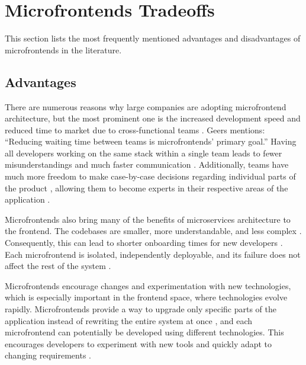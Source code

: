 \section{Microfrontends Tradeoffs}
This section lists the most frequently mentioned advantages and disadvantages of microfrontends in the literature.

\subsection{Advantages}
There are numerous reasons why large companies are adopting microfrontend architecture, but the most prominent one is the increased development speed and reduced time to market due to cross-functional teams \cite{Geers, Montelius, Peltonen}. Geers \cite{Geers} mentions: ``Reducing waiting time between teams is microfrontends' primary goal.'' Having all developers working on the same stack within a single team leads to fewer misunderstandings and much faster communication \cite{Geers, Montelius}. Additionally, teams have much more freedom to make case-by-case decisions regarding individual parts of the product \cite{Jackson, Geers}, allowing them to become experts in their respective areas of the application \cite{Montelius}.

Microfrontends also bring many of the benefits of microservices architecture to the frontend. The codebases are smaller, more understandable, and less complex \cite{Geers, Jackson, Montelius}. Consequently, this can lead to shorter onboarding times for new developers \cite{Peltonen}. Each microfrontend is isolated, independently deployable, and its failure does not affect the rest of the system \cite{Peltonen, Montelius, Jackson, Geers}.

Microfrontends encourage changes and experimentation with new technologies, which is especially important in the frontend space, where technologies evolve rapidly. Microfrontends provide a way to upgrade only specific parts of the application instead of rewriting the entire system at once \cite{Jackson, Montelius}, and each microfrontend can potentially be developed using different technologies. This encourages developers to experiment with new tools and quickly adapt to changing requirements \cite{Peltonen}.

